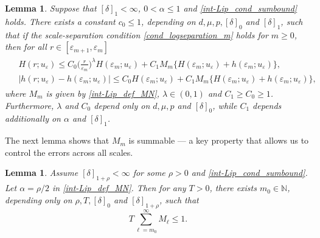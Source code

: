 \documentclass[reqno,12pt]{amsart} %
\newtheorem{lemma}[theorem]{Lemma}
\theoremstyle{definition}
\theoremstyle{remark}
\numberwithin{equation}{section}
\newcommand{\N}{\mathbb{N}}
\begin{document}
\begin{lemma}\label{int-Lip_prop_Hh}
    Suppose that $[\delta]_1<\infty$, $0<\alpha\leq 1$ and \eqref{int-Lip_cond_sumbound} holds. There exists a constant $c_0\leq 1$, depending on $d, \mu, p, [\delta]_0 $ and $[\delta]_1$, such that if the scale-separation condition \eqref{cond_logseparation_m} holds for $m\geq 0$, then for all $r\in [\varepsilon_{m+1}, \varepsilon_m]$
    \begin{align*}%
    \begin{split}
        & H(r; u_\varepsilon)\leq C_0 \Big(\frac{r}{\varepsilon_m}\Big)^\lambda H(\varepsilon_m; u_\varepsilon)+C_1M_m\{H(\varepsilon_m; u_\varepsilon)+h(\varepsilon_m; u_\varepsilon)\},\\
        & |h(r; u_\varepsilon)-h(\varepsilon_m; u_\varepsilon)|\leq C_0H(\varepsilon_m; u_\varepsilon)+C_1M_m\{H(\varepsilon_m; u_\varepsilon)+h(\varepsilon_m; u_\varepsilon)\},
    \end{split}
    \end{align*}
    where $M_m$ is given by \eqref{int-Lip_def_MN}, $\lambda\in(0, 1)$ and $C_1\geq C_0\geq 1$. Furthermore, $\lambda$ and $C_0$ depend only on $d, \mu, p $ and $[\delta]_0$, while $C_1$ depends additionally on $\alpha$ and $[\delta]_1$. 
\end{lemma}

The next lemma shows that $M_m$ is summable --- a key property that allows us to control the errors across all scales.

\begin{lemma}\label{lem.sumMm}
    Assume $[\delta]_{1+\rho} < \infty$ for some $\rho>0$ and \eqref{int-Lip_cond_sumbound}. Let $\alpha = \rho/2$ in \eqref{int-Lip_def_MN}. Then for any $T > 0$, there exists $m_0 \in \N$, depending only on $\rho, T, [\delta]_0$ and $[\delta]_{1+\rho}$, such that
    \begin{equation*}
        T \sum_{\ell = m_0}^\infty M_\ell \le 1.
    \end{equation*}
\end{lemma}
\end{document}
